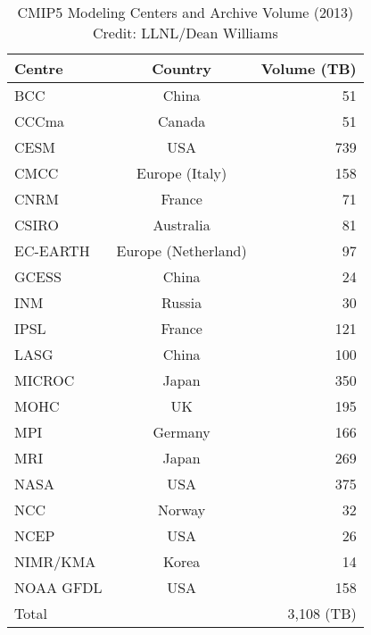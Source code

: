 \begin{table}[]
	\small
	\centering
	\begin{tabular}{  l | c | r  }
		Centre    & Country             & Volume (TB) \\ \hline\hline
		BCC       & China               & 51          \\ %
		CCCma     & Canada              & 51          \\ %
		CESM      & USA                 & 739         \\ %
		CMCC      & Europe (Italy)      & 158         \\ %
		CNRM      & France              & 71          \\ %
		CSIRO     & Australia           & 81          \\ %
		EC-EARTH  & Europe (Netherland) & 97          \\ %
		GCESS     & China               & 24          \\ %
		INM       & Russia              & 30          \\ %
		IPSL      & France              & 121         \\ %
		LASG      & China               & 100         \\ %
		MICROC    & Japan               & 350         \\ %
		MOHC      & UK                  & 195         \\ %
		MPI       & Germany             & 166         \\ %
		MRI       & Japan               & 269         \\ %
		NASA      & USA                 & 375         \\ %
		NCC       & Norway              & 32          \\ %
		NCEP      & USA                 & 26          \\ %
		NIMR/KMA  & Korea               & 14          \\ %
		NOAA GFDL & USA                 & 158         \\ \hline
		Total     &                     & 3,108 (TB)  \\ %
	\end{tabular}
	\caption{CMIP5 Modeling Centers and Archive Volume (2013) Credit: LLNL/Dean Williams}
	\label{tab:CMIP5_data_volume}
\end{table}
